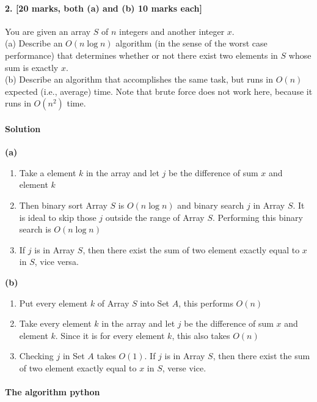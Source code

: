 \documentclass[a4paper]{scrartcl}
\begin{document}
\paragraph{2. [20 marks, both (a) and (b) 10 marks each]}

\label{sec:Question 2}
You are given an array $S$ of $n$ integers and
another integer $x$.\\
(a) Describe an $O(n \log{n})$ algorithm (in the sense of the worst case performance) that determines whether or not there exist two elements in $S$ whose sum is exactly $x$.\\
(b) Describe an algorithm that accomplishes the same task, but runs in $O(n)$ expected (i.e., average) time.
Note that brute force does not work here, because it runs in $O(n^2)$ time.

\paragraph{Solution}
{\bfseries(a)}
\begin{enumerate}
  \item Take a element $k$ in the array and let $j$ be the difference of sum $x$ and element $k$
  \item Then binary sort Array $S$ is $O(n\log{n})$ and binary search $j$ in Array $S$. It is ideal to skip those $j$ outside the range of Array $S$. Performing this binary search is $O(n\log{n})$
  \item If $j$ is in Array $S$, then there exist the sum of two element exactly equal to $x$ in $S$, vice versa.
\end{enumerate}

{\bfseries(b)}
\begin{enumerate}
 \item Put every element $k$ of Array $S$ into Set $A$, this performs $O(n)$
 \item Take every element $k$ in the array and let $j$ be the difference of sum $x$ and element $k$. Since it is for every element $k$, this also takes $O(n)$
 \item Checking $j$ in Set $A$ takes $O(1)$. If $j$ is in Array $S$, then there exist the sum of two element exactly equal to $x$ in $S$, verse vice.
\end{enumerate}

\paragraph{The algorithm python}
\label{sec:code}

\end{document}
